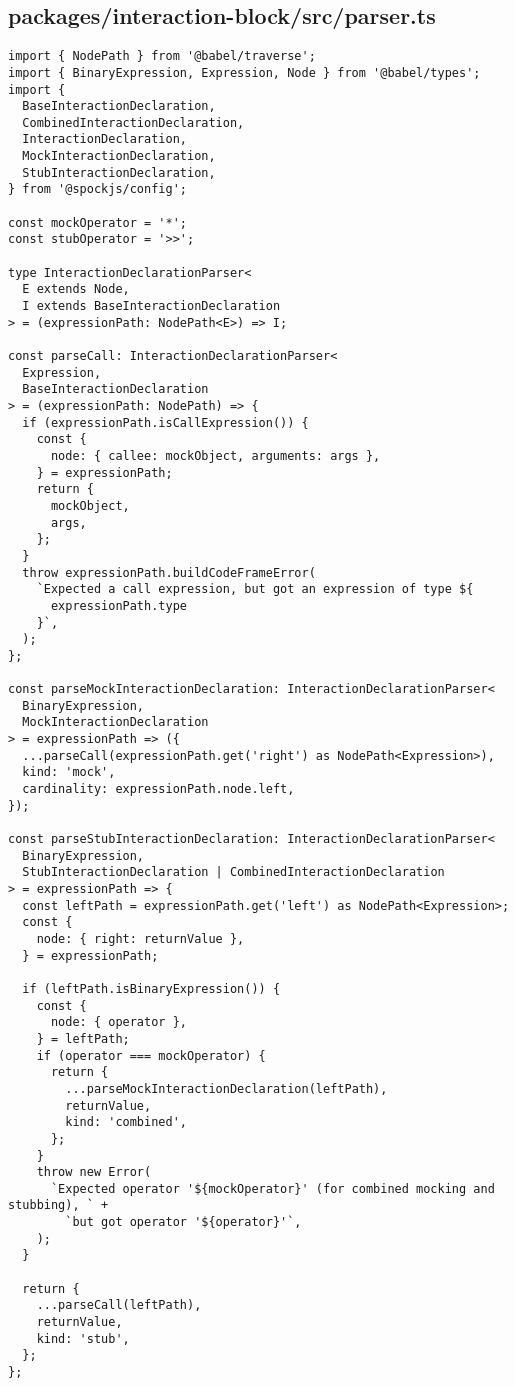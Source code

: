 \subsection*{packages/interaction-block/src/parser.ts}
\begin{verbatim}
import { NodePath } from '@babel/traverse';
import { BinaryExpression, Expression, Node } from '@babel/types';
import {
  BaseInteractionDeclaration,
  CombinedInteractionDeclaration,
  InteractionDeclaration,
  MockInteractionDeclaration,
  StubInteractionDeclaration,
} from '@spockjs/config';

const mockOperator = '*';
const stubOperator = '>>';

type InteractionDeclarationParser<
  E extends Node,
  I extends BaseInteractionDeclaration
> = (expressionPath: NodePath<E>) => I;

const parseCall: InteractionDeclarationParser<
  Expression,
  BaseInteractionDeclaration
> = (expressionPath: NodePath) => {
  if (expressionPath.isCallExpression()) {
    const {
      node: { callee: mockObject, arguments: args },
    } = expressionPath;
    return {
      mockObject,
      args,
    };
  }
  throw expressionPath.buildCodeFrameError(
    `Expected a call expression, but got an expression of type ${
      expressionPath.type
    }`,
  );
};

const parseMockInteractionDeclaration: InteractionDeclarationParser<
  BinaryExpression,
  MockInteractionDeclaration
> = expressionPath => ({
  ...parseCall(expressionPath.get('right') as NodePath<Expression>),
  kind: 'mock',
  cardinality: expressionPath.node.left,
});

const parseStubInteractionDeclaration: InteractionDeclarationParser<
  BinaryExpression,
  StubInteractionDeclaration | CombinedInteractionDeclaration
> = expressionPath => {
  const leftPath = expressionPath.get('left') as NodePath<Expression>;
  const {
    node: { right: returnValue },
  } = expressionPath;

  if (leftPath.isBinaryExpression()) {
    const {
      node: { operator },
    } = leftPath;
    if (operator === mockOperator) {
      return {
        ...parseMockInteractionDeclaration(leftPath),
        returnValue,
        kind: 'combined',
      };
    }
    throw new Error(
      `Expected operator '${mockOperator}' (for combined mocking and stubbing), ` +
        `but got operator '${operator}'`,
    );
  }

  return {
    ...parseCall(leftPath),
    returnValue,
    kind: 'stub',
  };
};


\end{verbatim}
